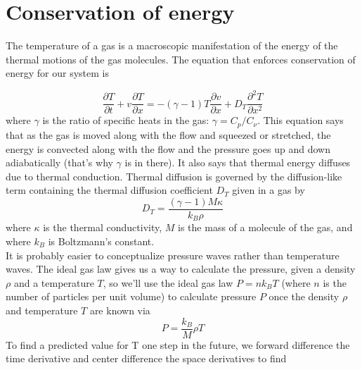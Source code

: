 \documentclass{book}
\theoremstyle{plain}
\theoremstyle{definition}
\numberwithin{exm}{chapter}
\theoremstyle{remark}
\theoremstyle{summary}
\theoremstyle{overview}
\begin{document}
\section*{Conservation of energy}

The temperature of a gas is a macroscopic manifestation of the energy of the
thermal motions of the gas molecules. The equation that enforces conservation
of energy for our system is

\begin{equation}\label{eq:1112}
\frac{\partial T}{\partial t}+v \frac{\partial T}{\partial x}=-(\gamma-1) T \frac{\partial v}{\partial x}+D_{T} \frac{\partial^{2} T}{\partial x^{2}}
\end{equation}
where $\gamma$ is the ratio of specific heats in the gas: $\gamma=C_{p} / C_{\nu}$. This equation says that as the gas is moved along with the flow and squeezed or stretched, the energy is convected along with the flow and the pressure goes up and down adiabatically (that\rq s why $\gamma$ is in there). It also says that thermal energy diffuses due to thermal conduction. Thermal diffusion is governed by the diffusion-like term containing the thermal diffusion coefficient $D_{T}$ given in a gas by
\begin{equation}\label{eq:1113}
D_{T}=\frac{(\gamma-1) M \kappa}{k_{B} \rho}
\end{equation}
where $\kappa$ is the thermal conductivity, $M$ is the mass of a molecule of the gas, and where $k_{B}$ is Boltzmann\rq s constant.\\
It is probably easier to conceptualize pressure waves rather than temperature waves. The ideal gas law gives us a way to calculate the pressure, given a density $\rho$ and a temperature $T$, so we\rq ll use the ideal gas law $P=n k_{B} T$ (where $n$ is the number of particles per unit volume) to calculate pressure $P$ once the density $\rho$ and temperature $T$ are known via
\begin{equation}\label{eq:1114}
P=\frac{k_{B}}{M} \rho T
\end{equation}
To find a predicted value for T one step in the future, we forward difference
the time derivative and center difference the space derivatives to find
\end{document}
